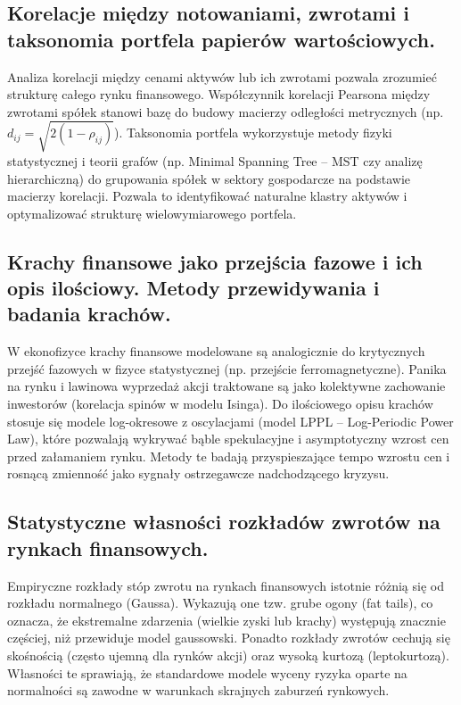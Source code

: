 \documentclass[11pt,a4paper]{article}
\begin{document}
\subsection{Korelacje między notowaniami, zwrotami i taksonomia portfela papierów wartościowych.}
Analiza korelacji między cenami aktywów lub ich zwrotami pozwala zrozumieć strukturę całego rynku finansowego. Współczynnik korelacji Pearsona między zwrotami spółek stanowi bazę do budowy macierzy odległości metrycznych (np. $d_{ij} = \sqrt{2(1 - \rho_{ij})}$). Taksonomia portfela wykorzystuje metody fizyki statystycznej i teorii grafów (np. Minimal Spanning Tree -- MST czy analizę hierarchiczną) do grupowania spółek w sektory gospodarcze na podstawie macierzy korelacji. Pozwala to identyfikować naturalne klastry aktywów i optymalizować strukturę wielowymiarowego portfela.

\subsection{Krachy finansowe jako przejścia fazowe i ich opis ilościowy. Metody przewidywania i badania krachów.}
W ekonofizyce krachy finansowe modelowane są analogicznie do krytycznych przejść fazowych w fizyce statystycznej (np. przejście ferromagnetyczne). Panika na rynku i lawinowa wyprzedaż akcji traktowane są jako kolektywne zachowanie inwestorów (korelacja spinów w modelu Isinga). Do ilościowego opisu krachów stosuje się modele log-okresowe z oscylacjami (model LPPL -- Log-Periodic Power Law), które pozwalają wykrywać bąble spekulacyjne i asymptotyczny wzrost cen przed załamaniem rynku. Metody te badają przyspieszające tempo wzrostu cen i rosnącą zmienność jako sygnały ostrzegawcze nadchodzącego kryzysu.

\subsection{Statystyczne własności rozkładów zwrotów na rynkach finansowych.}
Empiryczne rozkłady stóp zwrotu na rynkach finansowych istotnie różnią się od rozkładu normalnego (Gaussa). Wykazują one tzw. grube ogony (fat tails), co oznacza, że ekstremalne zdarzenia (wielkie zyski lub krachy) występują znacznie częściej, niż przewiduje model gaussowski. Ponadto rozkłady zwrotów cechują się skośnością (często ujemną dla rynków akcji) oraz wysoką kurtozą (leptokurtozą). Własności te sprawiają, że standardowe modele wyceny ryzyka oparte na normalności są zawodne w warunkach skrajnych zaburzeń rynkowych.
\end{document}
